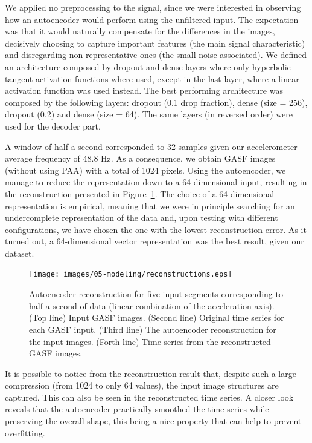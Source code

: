 {We applied no preprocessing to the signal, since we were interested in observing how an autoencoder would perform using the unfiltered input. The expectation was that it would naturally compensate for the differences in the images, decisively choosing to capture important features (the main signal characteristic) and disregarding non-representative ones (the small noise associated). We defined an architecture composed by dropout and dense layers where only hyperbolic tangent activation functions where used, except in the last layer, where a linear activation function was used instead. The best performing architecture was composed by the following layers: dropout (0.1 drop fraction), dense (size = 256), dropout (0.2) and dense (size = 64). The same layers (in reversed order) were used for the decoder part.

A window of half a second corresponded to 32 samples given our accelerometer average frequency of 48.8 Hz. As a consequence, we obtain GASF images (without using PAA) with a total of 1024 pixels. Using the autoencoder, we manage to reduce the representation down to a 64-dimensional input, resulting in the reconstruction presented in Figure~\ref{figure:reconstruction}. The choice of a 64-dimensional representation is empirical, meaning that we were in principle searching for an undercomplete representation of the data and, upon testing with different configurations, we have chosen the one with the lowest reconstruction error. As it turned out, a 64-dimensional vector representation was the best result, given our dataset. 

\begin{figure}[H]
	\centering
	\texttt{[image: images/05-modeling/reconstructions.eps]}
	\caption{Autoencoder reconstruction for five input segments corresponding to half a second of data (linear combination of the acceleration axis). ({Top line}) Input GASF images. ({Second line}) Original time series for each GASF input. ({Third line}) The autoencoder reconstruction for the input images. ({Forth line}) Time series from the reconstructed GASF images.}
  \label{figure:reconstruction}
\end{figure}

It is possible to notice from the reconstruction result that, despite such a large compression (from 1024 to only 64 values), the input image structures are captured. This can also be seen in the reconstructed time series. A closer look reveals that the autoencoder practically smoothed the time series while preserving the overall shape, this being a nice property that can help to prevent overfitting.

}
